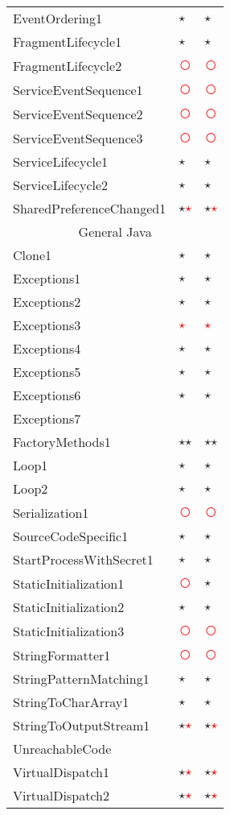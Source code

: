 \documentclass[../draft.tex]{subfiles}
\newcommand{\fp}{\textcolor{white}{\textcircled{\textcolor{red}{$\star$}}}}
\newcommand{\fn}{\textcolor{red}{\textcircled{ }}}
\newcommand{\tp}[0]{\textcircled{$\star$}}
\newcommand{\tsub}[1]{\multicolumn{3}{c}{#1}\\\hline}
\begin{document}
\begin{longtable}{l | l | l}
        EventOrdering1 & \tp & \tp\\
        FragmentLifecycle1 & \tp & \tp\\
        FragmentLifecycle2 & \fn & \fn\\
        ServiceEventSequence1 & \fn & \fn\\
        ServiceEventSequence2 & \fn & \fn\\
        ServiceEventSequence3 & \fn & \fn\\
        ServiceLifecycle1 & \tp & \tp\\
        ServiceLifecycle2 & \tp & \tp\\
        SharedPreferenceChanged1 & \tp \fp & \tp \fp\\
        \hline
        \tsub{General Java}
        Clone1 & \tp & \tp\\
        Exceptions1 & \tp & \tp \\
        Exceptions2 & \tp & \tp\\
        Exceptions3 & \fp & \fp \\
        Exceptions4 & \tp & \tp \\
        Exceptions5 & \tp & \tp \\
        Exceptions6 & \tp & \tp\\
        Exceptions7 & &\\
        FactoryMethods1 & \tp \tp & \tp \tp\\
        Loop1 & \tp & \tp\\
        Loop2 & \tp & \tp\\
        Serialization1 & \fn & \fn\\
        SourceCodeSpecific1 & \tp & \tp\\
        StartProcessWithSecret1 & \tp & \tp\\
        StaticInitialization1 & \fn & \tp\\
        StaticInitialization2 & \tp & \tp\\
        StaticInitialization3 & \fn & \fn\\
        StringFormatter1 & \fn & \fn\\
        StringPatternMatching1 & \tp & \tp\\
        StringToCharArray1 & \tp & \tp\\
        StringToOutputStream1 & \tp \fp & \tp \fp\\
        UnreachableCode & &\\
        VirtualDispatch1 & \tp \fp & \tp \fp\\
        VirtualDispatch2 & \tp \fp & \tp \fp\\

\end{longtable}
\end{document}
